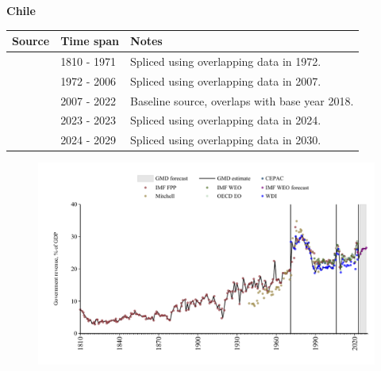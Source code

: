 \documentclass[12pt,a4paper,landscape]{article}
\begin{document}
\begin{adjustbox}{max totalsize={\paperwidth}{\paperheight},center}
\begin{minipage}[t][\textheight][t]{\textwidth}
\vspace*{0.5cm}
{}
\begin{center}
{\Large\bfseries Chile}
\end{center}
\vspace{0.5cm}
\begin{table}[H]
\centering
\small
\begin{tabular}{|l|l|l|}
\hline
\textbf{Source} & \textbf{Time span} & \textbf{Notes} \\
\hline
\rowcolor{white}\cite{IMF_FPP}& 1810 - 1971 &Spliced using overlapping data in 1972.\\
\rowcolor{lightgray}\cite{WDI}& 1972 - 2006 &Spliced using overlapping data in 2007.\\
\rowcolor{white}\cite{OECD_EO}& 2007 - 2022 &Baseline source, overlaps with base year 2018.\\
\rowcolor{lightgray}\cite{WDI}& 2023 - 2023 &Spliced using overlapping data in 2024.\\
\rowcolor{white}\cite{IMF_WEO_forecast}& 2024 - 2029 &Spliced using overlapping data in 2030.\\
\hline
\end{tabular}
\end{table}
\begin{figure}[H]
\centering
\includegraphics[width=\textwidth,height=0.6\textheight,keepaspectratio]{graphs/CHL_govrev_GDP.pdf}
\end{figure}
\end{minipage}
\end{adjustbox}
\end{document}
